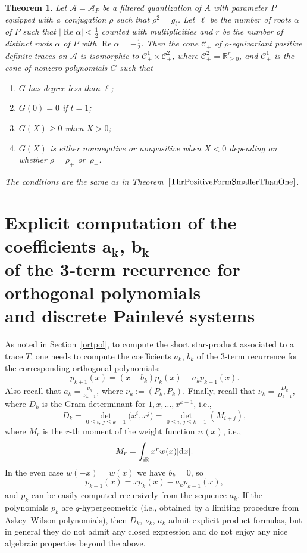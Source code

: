 \documentclass[pdftex]{sigma}
\newcommand{\RN}{\mathbb{R}} %
\newcommand{\mc}[1]{\mathcal{#1}}
\renewcommand{\Re}{\operatorname{Re}}
\newtheorem{Theorem}{Theorem}[section]
\theoremstyle{definition}
\numberwithin{equation}{section}
\begin{document}
\begin{Theorem}
Let $\mc{A}=\mc A_P$ be a filtered quantization of $A$ with parameter $P$ equipped with a~con\-jugation $\rho$ such that $\rho^2=g_t$. Let~$\ell$ be the number of roots $\alpha$ of $P$ such that $|\Re\alpha|<\frac{1}{2}$ counted with multiplicities and $r$ be the number of distinct roots $\alpha$ of $P$ with $\Re\alpha=-\frac{1}{2}$. Then the cone $\mc C_+$ of $\rho$-equivariant positive definite traces on $\mc{A}$ is isomorphic to $\mc C_+^1\times \mc C_+^2$, where $\mc C_+^2=\RN_{\geq 0}^r$, and $\mc C_+^1$ is the cone of nonzero polynomials $G$ such that
\begin{enumerate}\itemsep=0pt
\item[$(1)$]
$G$ has degree less than $\ell$;
\item[$(2)$]
$G(0)=0$ if $t=1$;
\item[$(3)$]
$G(X)\geq 0$ when $X>0$;
\item[$(4)$]
$G(X)$ is either nonnegative or nonpositive when $X<0$ depending on whether
$\rho=\rho_+$ or~$\rho_-$.
\end{enumerate}
The conditions are the same as in Theorem~$\ref{ThrPositiveFormSmallerThanOne}$.
\end{Theorem}

\section[Explicit computation of the coefficients ak, bk of the 3-term recurrence for orthogonal polynomials and discrete Painleve systems]
{Explicit computation of the coefficients $\boldsymbol{a_k}$, $\boldsymbol{b_k}$ \\of the 3-term recurrence for orthogonal polynomials \\and discrete Painlev\'e systems}
\label{expcom}

As noted in Section~\ref{ortpol}, to compute
the short star-product associated to a trace $T$,
one needs to compute the coefficients $a_k$, $b_k$ of the 3-term recurrence for the corresponding orthogonal polynomials:
\[
p_{k+1}(x)=(x-b_k)p_k(x)-a_kp_{k-1}(x).
\]
Also recall \cite{Sz} that
$a_k=\frac{\nu_k}{\nu_{k-1}}$, where $\nu_k:=(P_k,P_k)$. Finally, recall that
$\nu_k=\frac{D_k}{D_{k-1}}$, where
$D_k$ is the Gram determinant for $1,x,\dots,x^{k-1}$, i.e.,
\[
D_k=\det_{0\le i,\,j\le k-1}\big(x^i,x^j\big)=\det_{0\le i,\,j\le k-1}(M_{i+j}),
\]
where $M_r$ is the $r$-th moment of the weight function $w(x)$, i.e.,
\[
M_r=\int_{{\rm i}\mathbb R}x^rw(x)|{\rm d}x|.
\]
In the even case $w(-x)=w(x)$ we have $b_k=0$, so
\[
p_{k+1}(x)=xp_k(x)-a_kp_{k-1}(x),
\]
and $p_k$ can be easily computed recursively from the sequence $a_k$.
If the polynomials $p_k$ are $q$-hypergeometric (i.e., obtained by a limiting procedure from Askey--Wilson polynomials), then $D_k$, $\nu_k$, $a_k$ admit explicit product formulas, but in general they do not admit any closed expression and do not enjoy any nice algebraic properties beyond the above.
\end{document}
